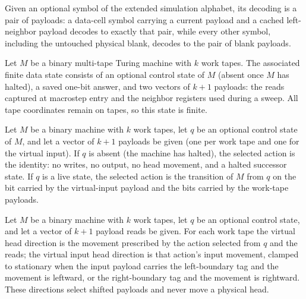\begin{definition}
\label{Complexity.dataCell}
\leanok
{}
Given an optional symbol of the extended simulation alphabet, its decoding is a pair
of payloads: a data-cell symbol carrying a current payload and a cached left-neighbor
payload decodes to exactly that pair, while every other symbol, including the untouched
physical blank, decodes to the pair of blank payloads.
\end{definition}

\begin{definition}
\label{Complexity.OblData}
\leanok
{}
Let $M$ be a binary multi-tape Turing machine with $k$ work tapes.  The associated
finite data state consists of an optional control state of $M$ (absent once $M$ has
halted), a saved one-bit answer, and two vectors of $k+1$ payloads: the reads captured
at macrostep entry and the neighbor registers used during a sweep.  All tape
coordinates remain on tapes, so this state is finite.
\end{definition}

\begin{definition}
\label{Complexity.obliviousSourceAction}
\leanok
{}
Let $M$ be a binary machine with $k$ work tapes, let $q$ be an optional control state
of $M$, and let a vector of $k+1$ payloads be given (one per work tape and one for the
virtual input).  If $q$ is absent (the machine has halted), the selected action is the
identity: no writes, no output, no head movement, and a halted successor state.  If
$q$ is a live state, the selected action is the transition of $M$ from $q$ on the bit
carried by the virtual-input payload and the bits carried by the work-tape payloads.
\end{definition}

\begin{definition}
\label{Complexity.obliviousSourceMove}
\leanok
{}
Let $M$ be a binary machine with $k$ work tapes, let $q$ be an optional control state,
and let a vector of $k+1$ payload reads be given.  For each work tape the virtual head
direction is the movement prescribed by the action selected from $q$ and the reads;
the virtual input head direction is that action's input movement, clamped to
stationary when the input payload carries the left-boundary tag and the movement is
leftward, or the right-boundary tag and the movement is rightward.  These directions
select shifted payloads and never move a physical head.
\end{definition}

